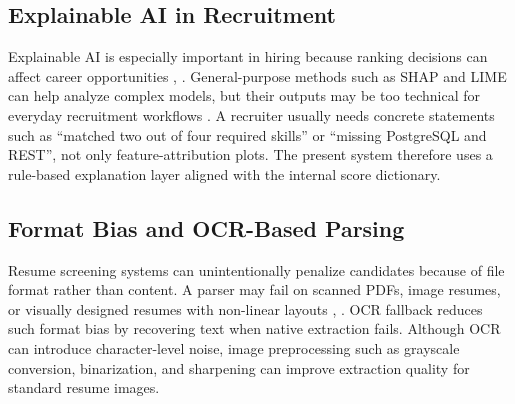 \subsection{Explainable AI in Recruitment}
Explainable AI is especially important in hiring because ranking decisions can affect career opportunities \cite{b8}, \cite{b14}. General-purpose methods such as SHAP and LIME can help analyze complex models, but their outputs may be too technical for everyday recruitment workflows \cite{b9}. A recruiter usually needs concrete statements such as ``matched two out of four required skills'' or ``missing PostgreSQL and REST'', not only feature-attribution plots. The present system therefore uses a rule-based explanation layer aligned with the internal score dictionary.

\subsection{Format Bias and OCR-Based Parsing}
Resume screening systems can unintentionally penalize candidates because of file format rather than content. A parser may fail on scanned PDFs, image resumes, or visually designed resumes with non-linear layouts \cite{b7}, \cite{b15}. OCR fallback reduces such format bias by recovering text when native extraction fails. Although OCR can introduce character-level noise, image preprocessing such as grayscale conversion, binarization, and sharpening can improve extraction quality for standard resume images.
